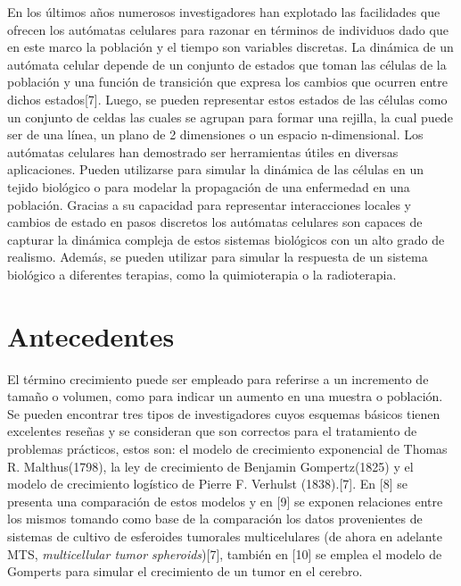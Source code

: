 \hspace{.1cm}En los últimos años numerosos investigadores han explotado las facilidades que ofrecen los autómatas celulares para razonar en términos de individuos dado que en este marco la población y el tiempo son variables discretas. La dinámica de un autómata celular depende de un conjunto de estados que toman las células de la población y una función de transición que expresa los cambios que ocurren entre dichos estados[7]. Luego, se pueden representar estos estados de las células como un conjunto de celdas las cuales se agrupan para formar una rejilla, la cual puede ser de una línea, un plano de 2 dimensiones o un espacio n-dimensional. Los autómatas celulares han demostrado ser herramientas útiles en diversas aplicaciones. Pueden utilizarse para simular la dinámica de las células en un tejido biológico o para modelar la propagación de una enfermedad en una población. Gracias a su capacidad para representar interacciones locales y cambios de estado en pasos discretos los autómatas celulares son capaces de capturar la dinámica compleja de estos sistemas biológicos con un alto grado de realismo. Además, se pueden utilizar para simular la respuesta de un sistema biológico a diferentes terapias, como la quimioterapia o la radioterapia.

\section{Antecedentes} 
\hspace{.1cm}El término crecimiento puede ser empleado para referirse a un incremento de tamaño o volumen, como para indicar un aumento en una muestra o poblaci\'on. Se pueden encontrar tres tipos de investigadores cuyos esquemas básicos tienen excelentes reseñas y se consideran que son correctos para el tratamiento de problemas prácticos, estos son: el modelo de crecimiento exponencial de Thomas R. Malthus(1798), la ley de crecimiento de Benjamin Gompertz(1825) y el modelo de crecimiento log\'istico de Pierre F. Verhulst (1838).[7]. En [8] se presenta una comparación de estos modelos y en [9] se exponen relaciones entre los mismos tomando como base de la comparación los datos provenientes de sistemas de cultivo de esferoides tumorales multicelulares (de ahora en adelante MTS, \textit{multicellular tumor spheroids})[7], también en [10] se emplea el modelo de Gomperts para simular el crecimiento de un tumor en el cerebro.

